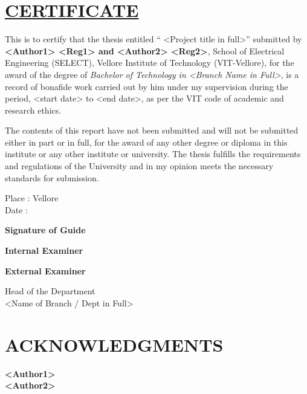 \documentclass[a4paper,12pt,bibliography=totocnumbered]{report}
\begin{document}
	\chapter*{\underline{CERTIFICATE}}
	\par This is to certify that the thesis entitled `` <Project title in full>'' submitted by \textbf{<Author1> <Reg1> and <Author2> <Reg2>}, School of Electrical Engineering (SELECT), Vellore Institute of Technology (VIT-Vellore), for the award of the degree of \textit{Bachelor of Technology in <Branch Name in Full>}, is a record of bonafide work carried out by him under my supervision during the period, <start date> to <end date>, as per the VIT code of academic and research ethics.\\
	\par The contents of this report have not been submitted and will not be submitted either in part or in full, for the award of any other degree or diploma in this institute or any other institute or university. The thesis fulfills the requirements and regulations of the University and in my opinion meets the necessary standards for submission.\\
	\vspace{15mm}
	\begin{flushleft}
		Place : Vellore\\
		Date : 
	\end{flushleft}
	\begin{flushright}
		\textbf{Signature of Guide}
	\end{flushright}
	\vspace{15mm}
	\begin{flushleft}
		\textbf{Internal Examiner}
	\end{flushleft}
	\begin{flushright}
		\textbf{External Examiner}
	\end{flushright}
	\vspace{7mm}
	\begin{center}
		{\large Head of the Department\\
	<Name of Branch / Dept in Full>}
	\end{center}
	\chapter*{ACKNOWLEDGMENTS}
	\blindtext
	\vfill
	\begin{flushright}
		\textbf{<Author1>\\}
		\vspace*{70px}
		\textbf{<Author2>}
	\end{flushright}
	
\end{document}
